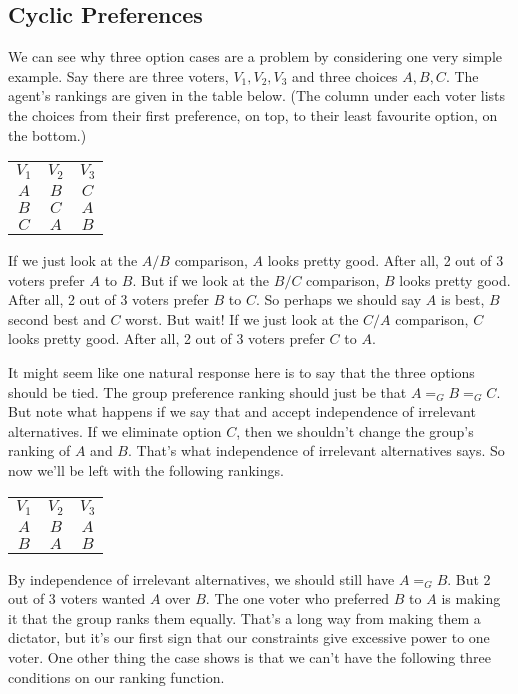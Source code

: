 \begin{multicols}{2}
\section{Cyclic Preferences}
We can see why three option cases are a problem by considering one very simple example. Say there are three voters, $V_1, V_2, V_3$ and three choices $A, B, C$. The agent's rankings are given in the table below. (The column under each voter lists the choices from their first preference, on top, to their least favourite option, on the bottom.)

\begin{center}
\begin{tabular}{c c c}
$V_1$ & $V_2$ & $V_3$ \\ 
$A$ & $B$ & $C$ \\
$B$ & $C$ & $A$ \\
$C$ & $A$ & $B$
\end{tabular}
\end{center}
If we just look at the $A/B$ comparison, $A$ looks pretty good. After all, 2 out of 3 voters prefer $A$ to $B$. But if we look at the $B/C$ comparison, $B$ looks pretty good. After all, 2 out of 3 voters prefer $B$ to $C$. So perhaps we should say $A$ is best, $B$ second best and $C$ worst. But wait! If we just look at the $C/A$ comparison, $C$ looks pretty good. After all, 2 out of 3 voters prefer $C$ to $A$.

It might seem like one natural response here is to say that the three options should be tied. The group preference ranking should just be that $A =_G B =_G  C$. But note what happens if we say that and accept independence of irrelevant alternatives. If we eliminate option $C$, then we shouldn't change the group's ranking of $A$ and $B$. That's what independence of irrelevant alternatives says. So now we'll be left with the following rankings.

\begin{center}
\begin{tabular}{c c c}
$V_1$ & $V_2$ & $V_3$ \\ 
$A$ & $B$ & $A$ \\
$B$ & $A$ & $B$ \\
\end{tabular}
\end{center}
By independence of irrelevant alternatives, we should still have $A =_G B$. But 2 out of 3 voters wanted $A$ over $B$. The one voter who preferred $B$ to $A$ is making it that the group ranks them equally. That's a long way from making them a dictator, but it's our first sign that our constraints give excessive power to one voter. One other thing the case shows is that we can't have the following three conditions on our ranking function.


\end{multicols}
